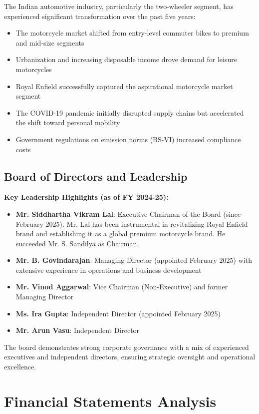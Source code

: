 \documentclass[8pt,a4paper]{article}
\begin{document}
The Indian automotive industry, particularly the two-wheeler segment, has experienced significant transformation over the past five years:

\begin{itemize}
    \item The motorcycle market shifted from entry-level commuter bikes to premium and mid-size segments
    \item Urbanization and increasing disposable income drove demand for leisure motorcycles
    \item Royal Enfield successfully captured the aspirational motorcycle market segment
    \item The COVID-19 pandemic initially disrupted supply chains but accelerated the shift toward personal mobility
    \item Government regulations on emission norms (BS-VI) increased compliance costs
\end{itemize}

\subsection{Board of Directors and Leadership}

\textbf{Key Leadership Highlights (as of FY 2024-25):}
\begin{itemize}
    \item \textbf{Mr. Siddhartha Vikram Lal}: Executive Chairman of the Board (since February 2025). Mr. Lal has been instrumental in revitalizing Royal Enfield brand and establishing it as a global premium motorcycle brand. He succeeded Mr. S. Sandilya as Chairman.
    \item \textbf{Mr. B. Govindarajan}: Managing Director (appointed February 2025) with extensive experience in operations and business development
    \item \textbf{Mr. Vinod Aggarwal}: Vice Chairman (Non-Executive) and former Managing Director
    \item \textbf{Ms. Ira Gupta}: Independent Director (appointed February 2025)
    \item \textbf{Mr. Arun Vasu}: Independent Director
\end{itemize}

The board demonstrates strong corporate governance with a mix of experienced executives and independent directors, ensuring strategic oversight and operational excellence.

\section{Financial Statements Analysis}
\end{document}

